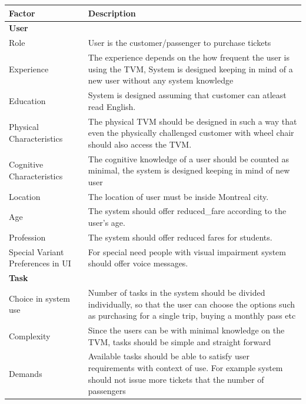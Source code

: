 \documentclass[a4paper,12pt]{report}
\begin{document}
\setlength{\tabcolsep}{18pt}
\renewcommand{\arraystretch}{1.5}
\begin{tabular}[H]{ |p{3cm}|p{12cm}| }
	\hline
	\textbf{Factor}  & \textbf{Description}  \\
	\hline
	\textbf{User} &   \\
	\hline
	Role &
	User is the customer/passenger to purchase tickets
	\\
	\hline
	Experience & 
	The experience depends on the how frequent the user is using the TVM, System is designed keeping in mind of a new user without any system knowledge
	\\
	\hline
	Education &
	System is designed assuming that customer can atleast read English.
	\\
	\hline
	Physical Characteristics    &
	The physical TVM should be designed in such a way that even the physically challenged customer with wheel chair should also access the TVM.
	\\
	\hline
	Cognitive Characteristics & 
	The cognitive knowledge of a user should be counted as minimal, the system is designed keeping in mind of new user
	\\
	\hline
	Location & 
	The location of user must be inside Montreal city.
	\\
	\hline
	Age & 
	The system should offer \gls{reduced_fare} according to the user's age.
	\\
	\hline
	Profession & 
	The system should offer reduced fares for students.
	\\
	\hline
	Special Variant Preferences in UI & 
	For special need people with visual impairment system should offer voice messages.



	\\
	\hline
	\textbf{Task} &  \\
	\hline
	Choice in system use &
	Number of tasks in the system should be divided individually, so that the user can choose the options such as purchasing for a single trip, buying a monthly pass etc
	\\
	\hline
	Complexity & 
	Since the users can be with minimal knowledge on the TVM, tasks should be simple and straight forward
	\\
	\hline
	Demands &
	Available tasks should be able to satisfy user requirements with context of use. For example system should not issue more tickets that the number of passengers 
	\\
	\hline 
\end{tabular}
\\ 
\end{document}
